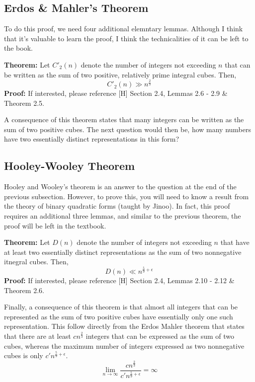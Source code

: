 \subsection{Erdos \& Mahler's Theorem}
To do this proof, we need four additional elemntary lemmas. Although I think that it's valuable to learn the proof, I think the technicalities of it can be left to the book.
\begin{boxedsection}
\textbf{Theorem:} Let $C'_2(n)$ denote the number of integers not exceeding $n$ that can be written as the sum of two positive, relatively prime integral cubes. Then, 
$$
C'_2(n) \gg n^{\frac{2}{3}}
$$
\textbf{Proof:} If interested, please reference [H] Section 2.4, Lemmas 2.6 - 2.9 \& Theorem 2.5.
\end{boxedsection}
A consequence of this theorem states that many integers can be written as the sum of two positive cubes. The next question would then be, how many numbers have two essentially distinct representations in this form?
\subsection{Hooley-Wooley Theorem}
Hooley and Wooley's theorem is an answer to the question at the end of the previous subsection. However, to prove this, you will need to know a result from the theory of binary quadratic forms (taught by Jinoo). In fact, this proof requires an additional three lemmas, and similar to the previous theorem, the proof will be left in the textbook.
\begin{boxedsection}
    \textbf{Theorem:} Let $D(n)$ denote the number of integers not exceeding $n$ that have at least two essentially distinct representations as the sum of two nonnegative itnegral cubes. Then,
    $$
    D(n) \ll n^{\frac{5}{9} + \epsilon}
    $$
    \textbf{Proof:} If interested, please reference [H] Section 2.4, Lemmas 2.10 - 2.12 \& Theorem 2.6.
\end{boxedsection}
Finally, a consequence of this theorem is that almost all integers that can be represented as the sum of two positive cubes have essentially only one such representation. This follow directly from the Erdos Mahler theorem that states that there are at least $cn^{\frac{2}{3}}$ integers that can be expressed as the sum of two cubes, whereas the maximum number of integers expressed as two nonnegative cubes is only $c'n^{\frac{5}{9} + \epsilon}$.
$$
\lim_{n\rightarrow\infty} \frac{cn^{\frac{2}{3}}}{c'n^{\frac{5}{9} + \epsilon}} = \infty
$$

